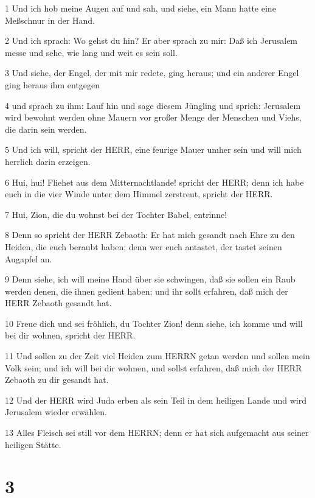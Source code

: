 \par 1 Und ich hob meine Augen auf und sah, und siehe, ein Mann hatte eine Meßschnur in der Hand.
\par 2 Und ich sprach: Wo gehst du hin? Er aber sprach zu mir: Daß ich Jerusalem messe und sehe, wie lang und weit es sein soll.
\par 3 Und siehe, der Engel, der mit mir redete, ging heraus; und ein anderer Engel ging heraus ihm entgegen
\par 4 und sprach zu ihm: Lauf hin und sage diesem Jüngling und sprich: Jerusalem wird bewohnt werden ohne Mauern vor großer Menge der Menschen und Viehs, die darin sein werden.
\par 5 Und ich will, spricht der HERR, eine feurige Mauer umher sein und will mich herrlich darin erzeigen.
\par 6 Hui, hui! Fliehet aus dem Mitternachtlande! spricht der HERR; denn ich habe euch in die vier Winde unter dem Himmel zerstreut, spricht der HERR.
\par 7 Hui, Zion, die du wohnst bei der Tochter Babel, entrinne!
\par 8 Denn so spricht der HERR Zebaoth: Er hat mich gesandt nach Ehre zu den Heiden, die euch beraubt haben; denn wer euch antastet, der tastet seinen Augapfel an.
\par 9 Denn siehe, ich will meine Hand über sie schwingen, daß sie sollen ein Raub werden denen, die ihnen gedient haben; und ihr sollt erfahren, daß mich der HERR Zebaoth gesandt hat.
\par 10 Freue dich und sei fröhlich, du Tochter Zion! denn siehe, ich komme und will bei dir wohnen, spricht der HERR.
\par 11 Und sollen zu der Zeit viel Heiden zum HERRN getan werden und sollen mein Volk sein; und ich will bei dir wohnen, und sollst erfahren, daß mich der HERR Zebaoth zu dir gesandt hat.
\par 12 Und der HERR wird Juda erben als sein Teil in dem heiligen Lande und wird Jerusalem wieder erwählen.
\par 13 Alles Fleisch sei still vor dem HERRN; denn er hat sich aufgemacht aus seiner heiligen Stätte.

\chapter{3}

